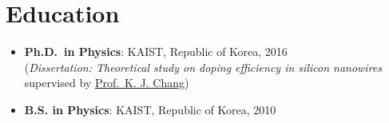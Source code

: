 \hypertarget{education}{%
\section{Education}\label{education}}

\begin{itemize}
\tightlist
\item
  \textbf{Ph.D.~in Physics}: KAIST, Republic of Korea, 2016\\
  (\emph{Dissertation: Theoretical study on doping efficiency in silicon
  nanowires} supervised by \href{http://taehae.kaist.ac.kr}{Prof.~K. J.
  Chang})
\item
  \textbf{B.S. in Physics}: KAIST, Republic of Korea, 2010
\end{itemize}
